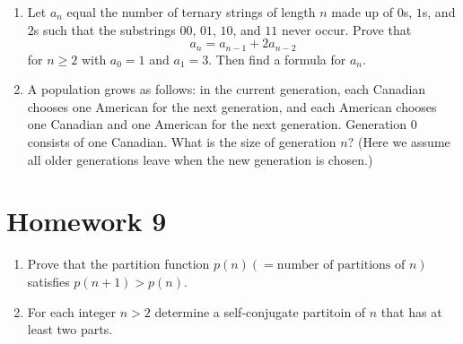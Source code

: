 \documentclass{report}
\begin{document}
{\begin{enumerate}
    \item Let $a_n$ equal  the number of ternary strings of length $n$ made
          up of $0$s, $1$s, and $2$s such that the substrings $00$, $01$, $10$,
          and $11$ never occur. Prove that $$a_n = a_{n-1} + 2a_{n-2}$$
          for $n \ge 2$ with $a_0 = 1$ and $a_1=3$. Then find a formula for
          $a_n$.

    \item A population grows as follows: in the current generation,
          each Canadian chooses one American for the next generation,
          and each American chooses one Canadian and one American for
          the next generation. Generation 0 consists of one Canadian.
          What is the size of generation $n$? (Here we assume all older
          generations leave when the new generation is chosen.)

\end{enumerate}

\section{Homework 9}

\begin{enumerate}
    \item Prove that the partition function $p(n)(=\text{number of partitions of } n)$
          satisfies $p(n+1) > p(n)$.


    \item For each integer $n > 2$ determine a self-conjugate partitoin of $n$
          that has at least two parts.


\end{enumerate}}
\end{document}
